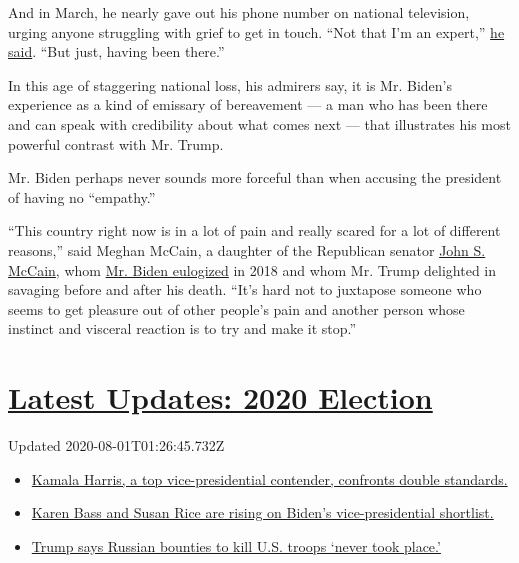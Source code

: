 And in March, he nearly gave out his phone number on national
television, urging anyone struggling with grief to get in touch. ``Not
that I'm an expert,''
\href{https://www.cnn.com/2020/03/27/politics/cnn-town-hall-takeaways-joe-biden/index.html}{he
said}. ``But just, having been there.''

In this age of staggering national loss, his admirers say, it is Mr.
Biden's experience as a kind of emissary of bereavement --- a man who
has been there and can speak with credibility about what comes next ---
that illustrates his most powerful contrast with Mr. Trump.

Mr. Biden perhaps never sounds more forceful than when accusing the
president of having no ``empathy.''

``This country right now is in a lot of pain and really scared for a lot
of different reasons,'' said Meghan McCain, a daughter of the Republican
senator
\href{https://www.nytimes.com/2018/08/25/obituaries/john-mccain-dead.html}{John
S. McCain}, whom
\href{https://www.nytimes.com/2018/08/30/us/politics/john-mccain-memorial.html}{Mr.
Biden eulogized} in 2018 and whom Mr. Trump delighted in savaging before
and after his death. ``It's hard not to juxtapose someone who seems to
get pleasure out of other people's pain and another person whose
instinct and visceral reaction is to try and make it stop.''

\hypertarget{latest-updates-2020-election}{%
\section{\texorpdfstring{\href{https://www.nytimes.com/2020/07/31/us/elections/biden-vs-trump.html?action=click\&pgtype=Article\&state=default\&region=MAIN_CONTENT_1\&context=storylines_live_updates}{Latest
Updates: 2020
Election}}{Latest Updates: 2020 Election}}\label{latest-updates-2020-election}}

Updated 2020-08-01T01:26:45.732Z

\begin{itemize}
\tightlist
\item
  \href{https://www.nytimes.com/2020/07/31/us/elections/biden-vs-trump.html?action=click\&pgtype=Article\&state=default\&region=MAIN_CONTENT_1\&context=storylines_live_updates\#link-29fdff45}{Kamala
  Harris, a top vice-presidential contender, confronts double
  standards.}
\item
  \href{https://www.nytimes.com/2020/07/31/us/elections/biden-vs-trump.html?action=click\&pgtype=Article\&state=default\&region=MAIN_CONTENT_1\&context=storylines_live_updates\#link-13ec3d9c}{Karen
  Bass and Susan Rice are rising on Biden's vice-presidential
  shortlist.}
\item
  \href{https://www.nytimes.com/2020/07/31/us/elections/biden-vs-trump.html?action=click\&pgtype=Article\&state=default\&region=MAIN_CONTENT_1\&context=storylines_live_updates\#link-49e9a016}{Trump
  says Russian bounties to kill U.S. troops `never took place.'}
\end{itemize}

